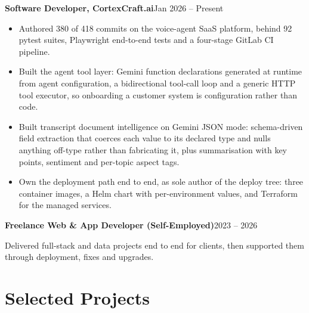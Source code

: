 \documentclass[10pt,a4paper]{article}
\newcommand{\entry}[2]{\textbf{#1}\hfill{#2}\par}
\begin{document}
\entry{Software Developer, CortexCraft.ai}{Jan 2026 -- Present}
\begin{itemize}
  \item Authored 380 of 418 commits on the voice-agent SaaS platform, behind 92 pytest suites,
        Playwright end-to-end tests and a four-stage GitLab CI pipeline.
  \item Built the agent tool layer: Gemini function declarations generated at runtime from agent
        configuration, a bidirectional tool-call loop and a generic HTTP tool executor, so
        onboarding a customer system is configuration rather than code.
  \item Built transcript document intelligence on Gemini JSON mode: schema-driven field extraction
        that coerces each value to its declared type and nulls anything off-type rather than
        fabricating it, plus summarisation with key points, sentiment and per-topic aspect tags.
  \item Own the deployment path end to end, as sole author of the deploy tree: three container
        images, a Helm chart with per-environment values, and Terraform for the managed services.
\end{itemize}

\vspace{1pt}
\entry{Freelance Web \& App Developer (Self-Employed)}{2023 -- 2026}
Delivered full-stack and data projects end to end for clients, then supported them through
deployment, fixes and upgrades.

\section{Selected Projects}
\end{document}
